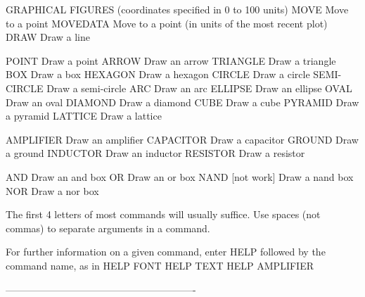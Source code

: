 GRAPHICAL FIGURES (coordinates specified in 0 to 100 units)
   MOVE                  Move to a point
   MOVEDATA              Move to a point (in units of the most recent
                         plot)
   DRAW                  Draw a line
 
   POINT                 Draw a point
   ARROW                 Draw an arrow
   TRIANGLE              Draw a triangle
   BOX                   Draw a box
   HEXAGON               Draw a hexagon
   CIRCLE                Draw a circle
   SEMI-CIRCLE           Draw a semi-circle
   ARC                   Draw an arc
   ELLIPSE               Draw an ellipse
   OVAL                  Draw an oval
   DIAMOND               Draw a diamond
   CUBE                  Draw a cube
   PYRAMID               Draw a pyramid
   LATTICE               Draw a lattice
 
   AMPLIFIER             Draw an amplifier
   CAPACITOR             Draw a capacitor
   GROUND                Draw a ground
   INDUCTOR              Draw an inductor
   RESISTOR              Draw a resistor
 
   AND                   Draw an and box
   OR                    Draw an or box
   NAND       [not work] Draw a nand box
   NOR                   Draw a nor box
 
The first 4 letters of most commands will usually suffice.  Use spaces
(not commas) to separate arguments in a command.
 
For further information on a given command, enter HELP   followed by
the command name, as in
   HELP FONT
   HELP TEXT
   HELP AMPLIFIER
 
----------------------------------------------------------
 
 
 
 
 
 
 
 
 
 
 
 
 
 
 
 
 
 
 
 
 
 
 
 
 
 
 
 
 
 
 
 
 
 
 
 
 
 
 
